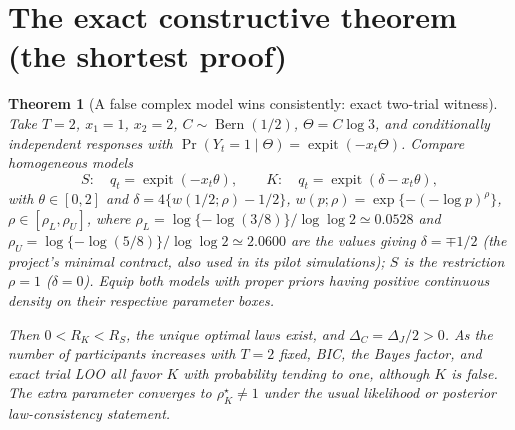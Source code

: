 \documentclass[11pt,letterpaper]{article}
\theoremstyle{plain}
\newtheorem{theorem}{Theorem}[section]
\theoremstyle{definition}
\newcommand{\Bern}{\operatorname{Bern}}
\newcommand{\sig}{\operatorname{expit}}
\begin{document}
\section{The exact constructive theorem (the shortest proof)}
\begin{theorem}[A false complex model wins consistently: exact two-trial witness]\label{thm:witness}
Take $T=2$, $x_1=1$, $x_2=2$, $C\sim\Bern(1/2)$, $\Theta=C\log3$, and conditionally independent responses with $\Pr(Y_t=1\mid\Theta)=\sig(-x_t\Theta)$. Compare homogeneous models
\[
S:\quad q_t=\sig(-x_t\theta),\qquad
K:\quad q_t=\sig(\delta-x_t\theta),
\]
with $\theta\in[0,2]$ and $\delta=4\{w(1/2;\rho)-1/2\}$, $w(p;\rho)=\exp\{-(-\log p)^\rho\}$, $\rho\in[\rho_L,\rho_U]$, where $\rho_L=\log\{-\log(3/8)\}/\log\log2\simeq0.0528$ and $\rho_U=\log\{-\log(5/8)\}/\log\log2\simeq2.0600$ are the values giving $\delta=\mp1/2$ (the project's minimal contract, also used in its pilot simulations); $S$ is the restriction $\rho=1$ ($\delta=0$). Equip both models with proper priors having positive continuous density on their respective parameter boxes.

Then $0<R_K<R_S$, the unique optimal laws exist, and $\Delta_C=\Delta_J/2>0$. As the number of participants increases with $T=2$ fixed, BIC, the Bayes factor, and exact trial LOO all favor $K$ with probability tending to one, although $K$ is false. The extra parameter converges to $\rho_K^\star\ne1$ under the usual likelihood or posterior law-consistency statement.
\end{theorem}
\end{document}

